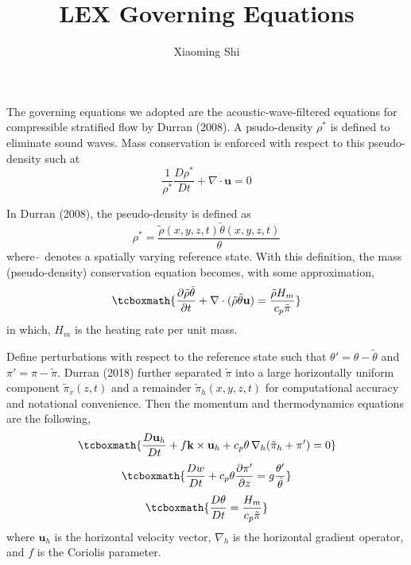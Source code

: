 \documentclass[a4paper,11pt]{article}
\title{\textbf{LEX Governing Equations}}
\author{Xiaoming Shi}
\begin{document}
\maketitle

The governing equations we adopted are the acoustic-wave-filtered equations for compressible stratified flow by Durran (2008). A psudo-density $\rho^*$ is defined to eliminate sound waves. Mass conservation is enforced with respect to this pseudo-density such at
\begin{equation}
 \frac{1}{\rho^*} \frac{D \rho^*}{D t} + \nabla\cdot \mathbf{u} = 0 \nonumber
\end{equation}

In Durran (2008), the pseudo-density is defined as 
\begin{equation}
 \rho^* = \frac{\tilde{\rho}(x,y,z,t)\tilde{\theta}(x,y,z,t)}{\theta} \nonumber 
\end{equation}
where $\tilde{\ }$ denotes a spatially varying reference state. With this definition, the mass (pseudo-density) conservation equation becomes, with some approximation,
\begin{equation}
\tcboxmath{
\frac{\partial \tilde{\rho} \tilde{\theta}}{\partial t} + \nabla\cdot (\tilde{\rho}\tilde{\theta}\mathbf{u}) = \frac{\tilde{\rho} H_m}{c_p \tilde{\pi}}
}
\end{equation}
in which, $H_m$ is the heating rate per unit mass. 

Define perturbations with respect to the reference state such that $\theta' = \theta - \tilde{\theta}$ and $\pi' = \pi - \tilde{\pi}$. Durran (2018) further separated $\tilde{\pi}$ into a large horizontally uniform component $\tilde{\pi}_v(z,t)$ and a remainder $\tilde{\pi}_h(x,y,z,t)$ for computational accuracy and notational convenience. Then the momentum and thermodynamics equations are the following,
\begin{equation}
\tcboxmath{
\frac{D \mathbf{u}_h}{D t}  + f {\mathbf{k}} \times \mathbf{u}_h +  c_p \theta\,\nabla_h(\tilde{\pi}_h + \pi') = 0
}
\end{equation}
\begin{equation}
 \tcboxmath{
 \frac{D w}{D t} + c_p \theta \frac{\partial \pi'}{\partial z} = g\frac{\theta'}{\tilde{\theta}}
 }
\end{equation}
\begin{equation}
\tcboxmath{
 \frac{D \theta }{D t} = \frac{H_m}{c_p \tilde{\pi}}
 }
\end{equation}
where $\mathbf{u}_h$ is the horizontal velocity vector, $\nabla_h$ is the horizontal gradient operator, and $f$ is the Coriolis parameter. 
\end{document}
